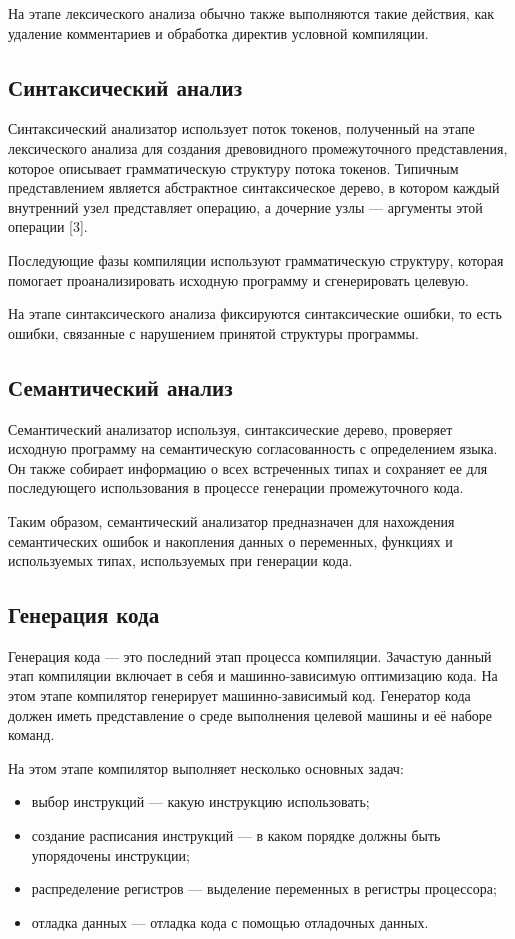 На этапе лексического анализа обычно также выполняются такие действия, как удаление комментариев и обработка директив условной компиляции.

\subsection{Синтаксический анализ}

Синтаксический анализатор использует поток токенов, полученный на этапе лексического анализа для создания древовидного промежуточного представления, которое описывает грамматическую структуру потока токенов.
Типичным представлением является абстрактное синтаксическое дерево, в котором каждый внутренний узел представляет операцию, а дочерние узлы — аргументы этой операции [3].

Последующие фазы компиляции используют грамматическую структуру, которая помогает проанализировать исходную программу и сгенерировать целевую.

На этапе синтаксического анализа фиксируются синтаксические ошибки, то есть ошибки, связанные с нарушением принятой структуры программы.

\subsection{Семантический анализ}

Семантический анализатор используя, синтаксические дерево, проверяет исходную программу на семантическую согласованность с определением языка.
Он также собирает информацию о всех встреченных типах и сохраняет ее для последующего использования в процессе генерации промежуточного кода.

Таким образом, семантический анализатор предназначен для нахождения семантических ошибок и накопления данных о переменных, функциях и используемых типах, используемых при генерации кода.

\subsection{Генерация кода}

Генерация кода — это последний этап процесса компиляции.
Зачастую данный этап компиляции включает в себя и машинно-зависимую оптимизацию кода.
На этом этапе компилятор генерирует машинно-зависимый код.
Генератор кода должен иметь представление о среде выполнения целевой машины и её наборе команд.

На этом этапе компилятор выполняет несколько основных задач:
\begin{itemize}
	\item выбор инструкций — какую инструкцию использовать;
	\item создание расписания инструкций — в каком порядке должны быть упорядочены инструкции;
	\item распределение регистров — выделение переменных в регистры процессора;
	\item отладка данных — отладка кода с помощью отладочных данных.
\end{itemize}

